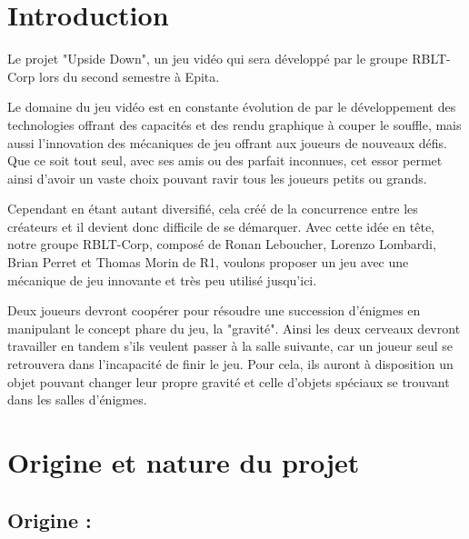 \documentclass[a4paper,11pt]{article}
\begin{document}
  



\newpage

\tableofcontents

\newpage


\section{Introduction}

Le projet "Upside Down", un jeu vidéo qui sera développé par le groupe RBLT-Corp lors 
du second semestre à Epita.\newline

Le domaine du jeu vidéo est en constante évolution de par le développement des technologies
offrant des capacités et des rendu graphique à couper le souffle, mais aussi l'innovation des
mécaniques de jeu offrant aux joueurs de nouveaux défis.
Que ce soit tout seul, avec ses amis ou des parfait inconnues, cet essor permet ainsi d'avoir 
un vaste choix pouvant ravir tous les joueurs petits ou grands.\newline

Cependant en étant autant diversifié, cela créé de la concurrence entre les créateurs et il devient
donc difficile de se démarquer.
Avec cette idée en tête, notre groupe RBLT-Corp, composé de Ronan Leboucher, Lorenzo Lombardi, Brian Perret et Thomas Morin de R1, 
voulons proposer un jeu avec une mécanique de jeu innovante et très peu utilisé jusqu'ici. \newline

Deux joueurs devront coopérer pour résoudre une succession d'énigmes en manipulant le concept phare du jeu, la "gravité".
Ainsi les deux cerveaux devront travailler en tandem s'ils veulent passer à la salle suivante, car un joueur seul se retrouvera
dans l'incapacité de finir le jeu. Pour cela, ils auront à disposition un objet pouvant changer leur propre gravité et celle d'objets
spéciaux se trouvant dans les salles d'énigmes.




\section{Origine et nature du projet}

\subsection{Origine :}
\end{document}
